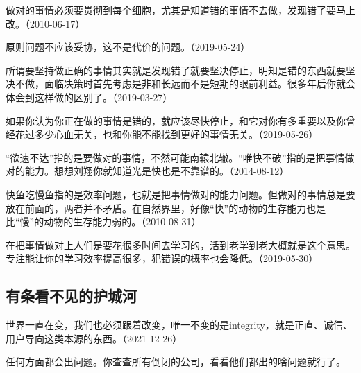 做对的事情必须要贯彻到每个细胞，尤其是知道错的事情不去做，发现错了要马上改。（2010-06-17）


原则问题不应该妥协，这不是代价的问题。（2019-05-24）


所谓要坚持做正确的事情其实就是发现错了就要坚决停止，明知是错的东西就要坚决不做，面临决策时首先考虑是非和长远而不是短期的眼前利益。很多年后你就会体会到这样做的区别了。（2019-03-27）

如果你认为你正在做的事情是错的，就应该尽快停止，和它对你有多重要以及你曾经花过多少心血无关，也和你能不能找到更好的事情无关。（2019-05-26）


“欲速不达”指的是要做对的事情，不然可能南辕北辙。“唯快不破”指的是把事情做对的能力。想想刘翔你就知道光是快也是不靠谱的。（2014-08-12）


快鱼吃慢鱼指的是效率问题，也就是把事情做对的能力问题。但做对的事情总是要放在前面的，两者并不矛盾。在自然界里，好像“快”的动物的生存能力也是比“慢”的动物的生存能力弱的。（2010-08-31）


在把事情做对上人们是要花很多时间去学习的，活到老学到老大概就是这个意思。专注能让你的学习效率提高很多，犯错误的概率也会降低。（2019-05-30）

\subsection{有条看不见的护城河}

世界一直在变，我们也必须跟着改变，唯一不变的是integrity，就是正直、诚信、用户导向这类本源的东西。（2021-12-26）


任何方面都会出问题。你查查所有倒闭的公司，看看他们都出的啥问题就行了。

